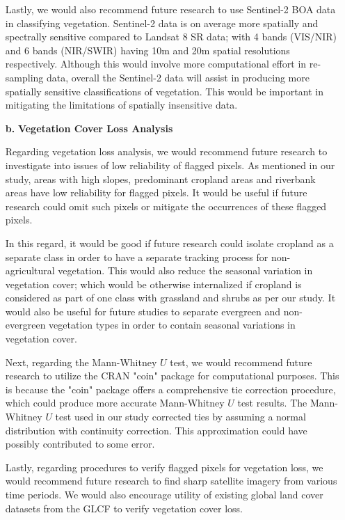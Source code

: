 \begin{itemize}
	\justify
	Lastly, we would also recommend future research to use Sentinel-2 BOA data in classifying vegetation. Sentinel-2 data is on average more spatially and spectrally sensitive compared to Landsat 8 SR data; with 4 bands (VIS/NIR) and 6 bands (NIR/SWIR) having 10m and 20m spatial resolutions respectively. Although this would involve more computational effort in re-sampling data, overall the Sentinel-2 data will assist in producing more spatially sensitive classifications of vegetation. This would be important in mitigating the limitations of spatially insensitive data.
	
	\clearpage
	
\item [\textbf{b.}] \textbf{Vegetation Cover Loss Analysis}\vspace{-0.25cm}

\justify
Regarding vegetation loss analysis, we would recommend future research to investigate into issues of low reliability of flagged pixels. As mentioned in our study, areas with high slopes, predominant cropland areas and riverbank areas have low reliability for flagged pixels. It would be useful if future research could omit such pixels or mitigate the occurrences of these flagged pixels. 

\justify
In this regard, it would be good if future research could isolate cropland as a separate class in order to have a separate tracking process for non-agricultural vegetation. This would also reduce the seasonal variation in vegetation cover; which would be otherwise internalized if cropland is considered as part of one class with grassland and shrubs as per our study. It would also be useful for future studies to separate evergreen and non-evergreen vegetation types in order to contain seasonal variations in vegetation cover.

\justify
Next, regarding the Mann-Whitney $U$ test, we would recommend future research to utilize the CRAN "coin" package for computational purposes. This is because the "coin" package offers a comprehensive tie correction procedure, which could produce more accurate Mann-Whitney $U$ test results. The Mann-Whitney $U$ test used in our study corrected ties by assuming a normal distribution with continuity correction. This approximation could have possibly contributed to some error.

\justify
Lastly, regarding procedures to verify flagged pixels for vegetation loss, we would recommend future research to find sharp satellite imagery from various time periods. We would also encourage utility of existing global land cover datasets from the GLCF to verify vegetation cover loss.\\


\end{itemize}
